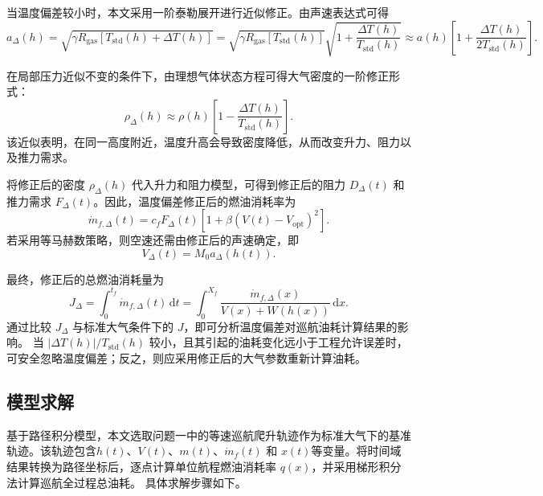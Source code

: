 \documentclass[withoutpreface,bwprint]{cumcmthesis} %
\begin{document}
当温度偏差较小时，本文采用一阶泰勒展开进行近似修正。由声速表达式可得
\begin{equation}
    a_{\Delta}(h)
    =
    \sqrt{\gamma R_{\mathrm{gas}}\left[T_{\mathrm{std}}(h)+\Delta T(h)\right]}
    =
    \sqrt{\gamma R_{\mathrm{gas}}\left[T_{\mathrm{std}}(h)\right]}\sqrt{1+\frac{\Delta T(h)}{T_{\mathrm{std}}(h)}}
    \approx
    a(h)
    \left[
    1+\frac{\Delta T(h)}{2T_{\mathrm{std}}(h)}
    \right].
    \label{eq:q2_a_delta}
\end{equation}

在局部压力近似不变的条件下，由理想气体状态方程可得大气密度的一阶修正形式：
\begin{equation}
    \rho_{\Delta}(h)
    \approx
    \rho(h)
    \left[
    1-\frac{\Delta T(h)}{T_{\mathrm{std}}(h)}
    \right].
    \label{eq:q2_rho_delta}
\end{equation}
该近似表明，在同一高度附近，温度升高会导致密度降低，从而改变升力、阻力以及推力需求。

将修正后的密度 $\rho_{\Delta}(h)$ 代入升力和阻力模型，可得到修正后的阻力
$D_{\Delta}(t)$ 和推力需求 $F_{\Delta}(t)$。因此，温度偏差修正后的燃油消耗率为
\begin{equation}
    \dot m_{f,\Delta}(t)
    =
    c_fF_{\Delta}(t)
    \left[
    1+\beta\left(V(t)-V_{\mathrm{opt}}\right)^2
    \right].
    \label{eq:q2_fuel_delta}
\end{equation}
若采用等马赫数策略，则空速还需由修正后的声速确定，即
\begin{equation}
    V_{\Delta}(t)=M_0a_{\Delta}(h(t)).
    \label{eq:q2_V_delta}
\end{equation}

最终，修正后的总燃油消耗量为
\begin{equation}
    J_{\Delta}
    =
    \int_{0}^{t_f}\dot m_{f,\Delta}(t)\,\mathrm{d}t
    =
    \int_{0}^{X_f}
    \frac{\dot m_{f,\Delta}(x)}{V(x)+W(h(x))}\,\mathrm{d}x.
    \label{eq:q2_total_delta}
\end{equation}
通过比较 $J_{\Delta}$ 与标准大气条件下的 $J$，即可分析温度偏差对巡航油耗计算结果的影响。
当 $\left|\Delta T(h)\right|/T_{\mathrm{std}}(h)$ 较小，且其引起的油耗变化远小于工程允许误差时，
可安全忽略温度偏差；反之，则应采用修正后的大气参数重新计算油耗。
\subsection{模型求解}
基于路径积分模型，本文选取问题一中的等速巡航爬升轨迹作为标准大气下的基准轨迹。该轨迹包含$h(t)$、$V(t)$、$m(t)$、$\dot m_f(t)$ 和 $x(t)$等变量。将时间域结果转换为路径坐标后，逐点计算单位航程燃油消耗率 $q(x)$，并采用梯形积分法计算巡航全过程总油耗。
具体求解步骤如下。
\end{document}
